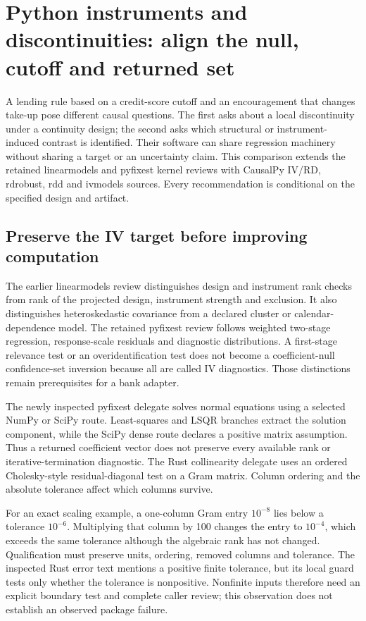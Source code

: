\section{Python instruments and discontinuities: align the null, cutoff and returned set}
\label{sec:exec25-python-iv-rd}

A lending rule based on a credit-score cutoff and an encouragement that
changes take-up pose different causal questions. The first asks about a
local discontinuity under a continuity design; the second asks which
structural or instrument-induced contrast is identified. Their software
can share regression machinery without sharing a target or an uncertainty
claim. This comparison extends the retained linearmodels and pyfixest
kernel reviews with CausalPy IV/RD, rdrobust, rdd and ivmodels sources.
Every recommendation is conditional on the specified design and artifact.
\citep{exec25_pyrdiv_choice,exec22_pyiv_kernels_linearmodels,
exec22_pyiv_kernels_pyfixest}

\subsection{Preserve the IV target before improving computation}
The earlier linearmodels review distinguishes design and instrument rank
checks from rank of the projected design, instrument strength and exclusion.
It also distinguishes heteroskedastic covariance from a declared cluster or
calendar-dependence model. The retained pyfixest review follows weighted
two-stage regression, response-scale residuals and diagnostic distributions.
A first-stage relevance test or an overidentification test does not become
a coefficient-null confidence-set inversion because all are called IV
diagnostics. Those distinctions remain prerequisites for a bank adapter.
\citep{exec22_pyiv_kernels_linearmodels,exec22_pyiv_kernels_pyfixest,
exec22_pyiv_reference}

The newly inspected pyfixest delegate solves normal equations using a
selected NumPy or SciPy route. Least-squares and LSQR branches extract
the solution component, while the SciPy dense route declares a positive
matrix assumption. Thus a returned coefficient vector does not preserve
every available rank or iterative-termination diagnostic. The Rust
collinearity delegate uses an ordered Cholesky-style residual-diagonal
test on a Gram matrix. Column ordering and the absolute tolerance affect
which columns survive.~\citep{exec25_pyrdiv_pyfixest}

For an exact scaling example, a one-column Gram entry $10^{-8}$ lies below
a tolerance $10^{-6}$. Multiplying that column by 100 changes the entry to
$10^{-4}$, which exceeds the same tolerance although the algebraic rank
has not changed. Qualification must preserve units, ordering, removed
columns and tolerance. The inspected Rust error text mentions a positive
finite tolerance, but its local guard tests only whether the tolerance is
nonpositive. Nonfinite inputs therefore need an explicit boundary test and
complete caller review; this observation does not establish an observed
package failure.~\citep{exec25_pyrdiv_pyfixest,exec25_pyrdiv_choice}

